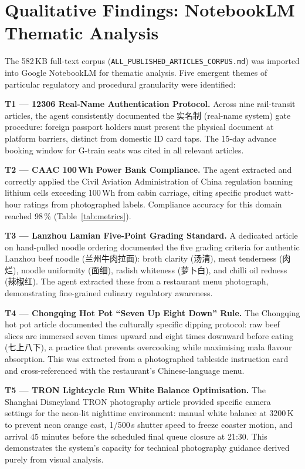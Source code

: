 \documentclass[conference]{IEEEtran}
\begin{document}
\section{Qualitative Findings: NotebookLM Thematic Analysis}
\label{sec:qualitative}

The 582\,KB full-text corpus (\texttt{ALL\_PUBLISHED\_ARTICLES\_CORPUS.md})
was imported into Google NotebookLM for thematic analysis. Five emergent
themes of particular regulatory and procedural granularity were identified:

\textbf{T1 — 12306 Real-Name Authentication Protocol.} Across nine rail-transit
articles, the agent consistently documented the 实名制 (real-name system)
gate procedure: foreign passport holders must present the physical document
at platform barriers, distinct from domestic ID card taps. The 15-day advance
booking window for G-train seats was cited in all relevant articles.

\textbf{T2 — CAAC 100\,Wh Power Bank Compliance.} The agent extracted and
correctly applied the Civil Aviation Administration of China regulation
banning lithium cells exceeding 100\,Wh from cabin carriage, citing specific
product watt-hour ratings from photographed labels. Compliance accuracy
for this domain reached 98\,\% (Table~\ref{tab:metrics}).

\textbf{T3 — Lanzhou Lamian Five-Point Grading Standard.} A dedicated article
on hand-pulled noodle ordering documented the five grading criteria for
authentic Lanzhou beef noodle (兰州牛肉拉面): broth clarity (汤清),
meat tenderness (肉烂), noodle uniformity (面细), radish whiteness (萝卜白),
and chilli oil redness (辣椒红). The agent extracted these from a restaurant
menu photograph, demonstrating fine-grained culinary regulatory awareness.

\textbf{T4 — Chongqing Hot Pot ``Seven Up Eight Down'' Rule.} The Chongqing
hot pot article documented the culturally specific dipping protocol: raw beef
slices are immersed seven times upward and eight times downward before eating
(七上八下), a practice that prevents overcooking while maximising mala
flavour absorption. This was extracted from a photographed tableside instruction
card and cross-referenced with the restaurant's Chinese-language menu.

\textbf{T5 — TRON Lightcycle Run White Balance Optimisation.} The Shanghai
Disneyland TRON photography article provided specific camera settings for
the neon-lit nighttime environment: manual white balance at 3200\,K
to prevent neon orange cast, 1/500\,s shutter speed to freeze coaster motion,
and arrival 45 minutes before the scheduled final queue closure at 21:30.
This demonstrates the system's capacity for technical photography guidance
derived purely from visual analysis.
\end{document}
